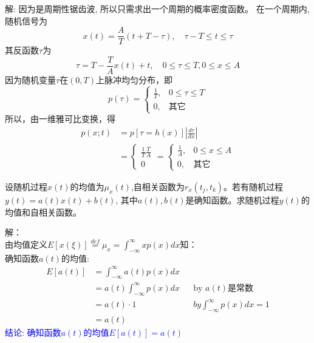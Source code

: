 \begin{frame}
解: 因为是周期性锯齿波, 所以只需求出一个周期的概率密度函数。
在一个周期内,随机信号为
\[x(t)=\frac{A}{T}(t+T-\tau),\quad \tau-T\le t\le\tau \]
其反函数$\tau$为
\[\tau=T-\frac{T}{A}x(t)+t,\quad 0\le\tau\le T,0\le x\le A \]
因为随机变量$\tau$在$(0,T)$上脉冲均匀分布，即
\[
p(\tau)=\begin{cases}
\frac{1}{T},&0\le\tau\le T\\
0,&\text{其它}
\end{cases} 
\]
所以，由一维雅可比变换，得
\begin{align*}
p(x;t)&=p[\tau=h(x)]\left|\frac{d\tau}{dx}\right|\\
&=\begin{cases}
\frac{1}{T}\frac{T}{A}\\
0
\end{cases}
=\begin{cases}
\frac{1}{A}, &0\le x\le A\\
0,&\text{其它}
\end{cases}
\end{align*}
\end{frame}

\begin{frame}
\begin{example}
设随机过程$x(t)$的均值为$\mu_x(t)$,自相关函数为$r_x(t_j,t_k)$。若有随机过程$y(t)=a(t)x(t)+b(t)$, 其中$a(t),b(t)$是确知函数。求随机过程$y(t)$的均值和自相关函数。
\end{example}
\end{frame}

\begin{frame}
解：\\
由均值定义$E[x(\xi)]\mathop{=}\limits^{def}\mu_x=\int_{-\infty}^{\infty}xp(x)dx$知：\\
确知函数$a(t)$的均值:
\begin{align*}
E[a(t)]&=\int_{-\infty}^{\infty}a(t)p(x)dx\\
&=a(t)\int_{-\infty}^{\infty}p(x)dx &&\text{by $a(t)$是常数}\\
&=a(t)\cdot 1 &&by \int_{-\infty}^{\infty}p(x)dx=1\\
&=a(t)
\end{align*}
\textcolor{blue}{结论: 确知函数$a(t)$的均值$E[a(t)]=a(t)$}
\end{frame}

